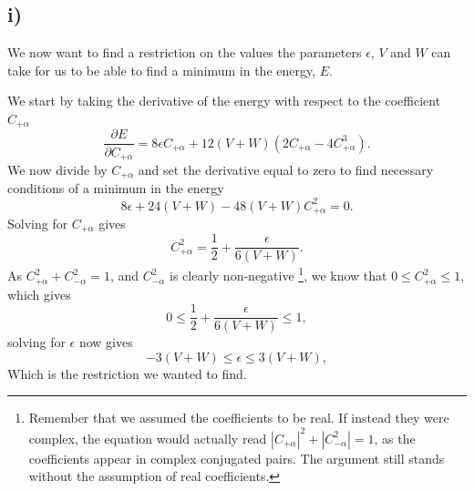 \documentclass[a4paper, 11pt, notitlepage, english]{article}
\newcommand{\eps}{\epsilon}
\newcommand{\p}{\partial}
\begin{document}
\subsection*{i)}

We now want to find a restriction on the values the parameters $\eps$, $V$ and $W$ can take for us to be able to find a minimum in the energy, $E$.

We start by taking the derivative of the energy with respect to the coefficient $C_{+\alpha}$
$$\frac{\p E}{\p C_{+\alpha}} = 8\eps C_{+\alpha} + 12(V+W)(2C_{+\alpha} - 4C_{+\alpha}^{3}).$$
We now divide by $C_{+\alpha}$ and set the derivative equal to zero to find necessary conditions of a minimum in the energy
$$8\eps + 24(V+W) - 48(V+W)C_{+\alpha}^{2} = 0.$$
Solving for $C_{+\alpha}$ gives
$$C_{+\alpha}^{2} = \frac{1}{2} + \frac{\eps}{6(V+W)}.$$
As $C_{+\alpha}^{2} + C_{-\alpha}^{2} = 1$, and $C_{-\alpha}^{2}$ is clearly non-negative
\footnote{Remember that we assumed the coefficients to be real. If instead they were complex, the equation would actually read $|C_{+\alpha}|^{2} + |C_{-\alpha}^{2}|=1$, as the coefficients appear in complex conjugated pairs. The argument still stands without the assumption of real coefficients.}, we know that $0 \leq C_{+\alpha}^{2} \leq 1$, which gives
$$0 \leq \frac{1}{2} + \frac{\eps}{6(V+W)} \leq 1,$$
solving for $\eps$ now gives
$$-3(V+W) \leq \eps \leq 3(V+W),$$
Which is the restriction we wanted to find.
\end{document}

